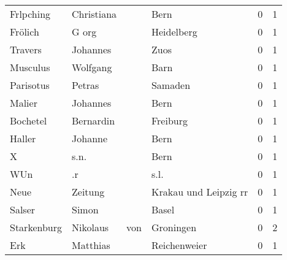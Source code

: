 \begin{tabular}{llllrr}
                Frlpching &                         Christiana &             &                                        Bern &          0 &         1 \\
                  Frölich &                              G org &             &                                  Heidelberg &          0 &         1 \\
                  Travers &                           Johannes &             &                                        Zuos &          0 &         1 \\
                 Musculus &                           Wolfgang &             &                                        Barn &          0 &         1 \\
                Parisotus &                             Petras &             &                                     Samaden &          0 &         1 \\
                   Malier &                           Johannes &             &                                        Bern &          0 &         1 \\
                 Bochetel &                          Bernardin &             &                                    Freiburg &          0 &         1 \\
                   Haller &                            Johanne &             &                                        Bern &          0 &         1 \\
                        X &                               s.n. &             &                                        Bern &          0 &         1 \\
                      WUn &                                 .r &             &                                        s.l. &          0 &         1 \\
                     Neue &                            Zeitung &             &                       Krakau und Leipzig rr &          0 &         1 \\
                   Salser &                              Simon &             &                                       Basel &          0 &         1 \\
              Starkenburg &                           Nikolaus &         von &                                   Groningen &          0 &         2 \\
                      Erk &                           Matthias &             &                                Reichenweier &          0 &         1 \\

\end{tabular}

